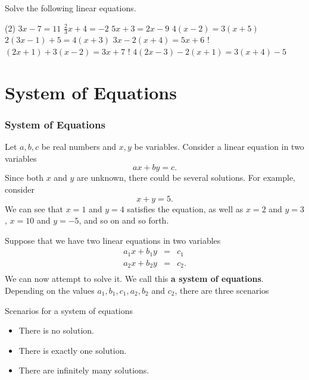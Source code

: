 \begin{frame}
\begin{exercisebox}{}{}
Solve the following linear equations.
\begin{tasks}(2)
\task $3x - 7 = 11$
\task $\displaystyle \frac{2}{3}x + 4 = -2$
\task $5x + 3 = 2x - 9$
\task $4(x - 2) = 3(x + 5)$
\task $2(3x - 1) + 5 = 4(x + 3)$
\task $3x - 2(x + 4) = 5x + 6$
\task! $(2x + 1) + 3(x - 2) = 3x + 7$
\task! $4(2x - 3) - 2(x + 1) = 3(x + 4) - 5$
\end{tasks}
\end{exercisebox}
\end{frame}

\section[System]{System of Equations}
\frame{\sectionpage}

\begin{frame}
\frametitle{System of Equations}
Let $a,b,c$ be real numbers and $x,y$ be variables. Consider a linear equation in two variables
\[ax + by = c.\] 
Since both $x$ and $y$ are unknown, there could be several solutions. For example, consider
\[ x+y=5.\]
We can see that $x=1$ and $y=4$ satisfies the equation, as well as $x=2$ and $y=3$, $x=10$ and $y=-5$, and so on and so forth.
\end{frame}

\begin{frame}
Suppose that we have two linear equations in two variables
\begin{eqnarray*}
a_1x+b_1y &=& c_1 \\
a_2x+b_2y &=& c_2.\\
\end{eqnarray*}
We can now attempt to solve it. We call this \textbf{a system of equations}. Depending on the values $a_1,b_1,c_1,a_2,b_2$ and $c_2$, there are three scenarios
\begin{remark}{Scenarios for a system of equations}
\begin{itemize}
\item There is no solution.
\item There is exactly one solution.
\item There are infinitely many solutions.
\end{itemize}
\end{remark}
\end{frame}

